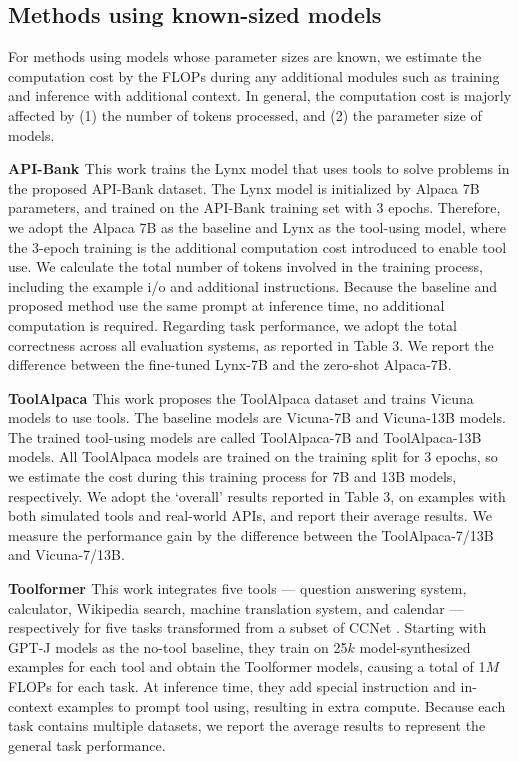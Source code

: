\subsection{Methods using known-sized models}

For methods using models whose parameter sizes are known, we estimate the computation cost by the FLOPs during any additional modules such as training and inference with additional context. In general, the computation cost is majorly affected by (1) the number of tokens processed, and (2) the parameter size of models.



\noindent \textbf{API-Bank \citep{li-etal-2023-api}} \quad
This work trains the Lynx model that uses tools to solve problems in the proposed API-Bank dataset. The Lynx model is initialized by Alpaca 7B parameters, and trained on the API-Bank training set with 3 epochs. Therefore, we adopt the Alpaca 7B as the baseline and Lynx as the tool-using model, where the 3-epoch training is the additional computation cost introduced to enable tool use.
We calculate the total number of tokens involved in the training process, including the example i/o and additional instructions. 
Because the baseline and proposed method use the same prompt at inference time, no additional computation is required.
Regarding task performance, we adopt the total correctness across all evaluation systems, as reported in Table 3. We report the difference between the fine-tuned Lynx-7B and the zero-shot Alpaca-7B.


\noindent \textbf{ToolAlpaca \citep{tang2023toolalpaca}} \quad
This work proposes the ToolAlpaca dataset and trains Vicuna models to use tools. The baseline models are Vicuna-7B and Vicuna-13B models. The trained tool-using models are called ToolAlpaca-7B and ToolAlpaca-13B models. All ToolAlpaca models are trained on the training split for 3 epochs, so we estimate the cost during this training process for 7B and 13B models, respectively.
We adopt the `overall' results reported in Table 3, on examples with both simulated tools and real-world APIs, and report their average results. We measure the performance gain by the difference between the ToolAlpaca-7/13B and Vicuna-7/13B. 


\noindent \textbf{Toolformer \citep{schick2023toolformer}} \quad
This work integrates five tools --- question answering system, calculator, Wikipedia search, machine translation system, and calendar --- respectively for five tasks transformed from a subset of CCNet \citep{wenzek2020ccnet}.
Starting with GPT-J models \citep{wang2021gpt-j} as the no-tool baseline, they train on 25$k$ model-synthesized examples for each tool and obtain the Toolformer models, causing a total of 1$M$ FLOPs for each task. At inference time, they add special instruction and in-context examples to prompt tool using, resulting in extra compute.
Because each task contains multiple datasets, we report the average results to represent the general task performance.




